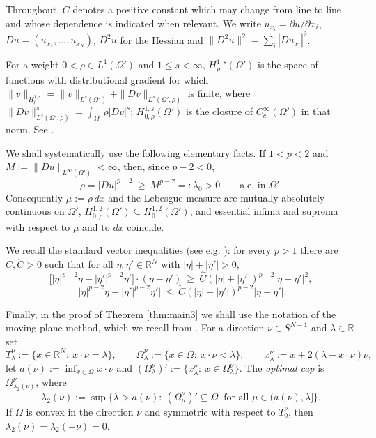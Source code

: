 \documentclass[reqno]{amsart}
\theoremstyle{plain}
\theoremstyle{definition}
\theoremstyle{remark}
\newcommand{\R}{\mathbb{R}}
\begin{document}
Throughout, $C$ denotes a positive constant which may change from line to line and whose dependence
is indicated when relevant. We write $u_{x_i}=\partial u/\partial x_i$, $Du=(u_{x_1},\dots,u_{x_N})$,
$D^2u$ for the Hessian and $\|D^2u\|^2=\sum_{i}|Du_{x_i}|^2$.

For a weight $0<\rho\in L^1(\Omega')$ and $1\le s<\infty$, $H^{1,s}_{\rho}(\Omega')$ is the space of
functions with distributional gradient for which
$\|v\|_{H^{1,s}_\rho}=\|v\|_{L^s(\Omega')}+\|Dv\|_{L^s(\Omega',\rho)}$ is finite, where
$\|Dv\|^s_{L^s(\Omega',\rho)}=\int_{\Omega'}\rho|Dv|^s$; $H^{1,s}_{0,\rho}(\Omega')$ is the closure of
$C_c^\infty(\Omega')$ in that norm. See \cite{DS1,HKM,Tru2}.

We shall systematically use the following elementary facts. If $1<p<2$ and
$M:=\|Du\|_{L^\infty(\Omega')}<\infty$, then, since $p-2<0$,
\begin{equation}\label{eq:lowerweight}
\rho=|Du|^{p-2}\ \ge\ M^{p-2}=:\lambda_0>0\qquad\text{a.e. in }\Omega' .
\end{equation}
Consequently $\mu:=\rho\,dx$ and the Lebesgue measure are mutually absolutely continuous on
$\Omega'$, $H^{1,2}_{0,\rho}(\Omega')\subseteq H^{1,2}_0(\Omega')$, and essential infima and suprema
with respect to $\mu$ and to $dx$ coincide.

We recall the standard vector inequalities (see e.g. \cite[Lemma 2.1]{Dam1}): for every $p>1$ there
are $\hat C,\check C>0$ such that for all $\eta,\eta'\in\R^N$ with $|\eta|+|\eta'|>0$,
\begin{equation}\label{eq:vector}
\big[|\eta|^{p-2}\eta-|\eta'|^{p-2}\eta'\big]\cdot(\eta-\eta')\ \ge\ \hat C(|\eta|+|\eta'|)^{p-2}|\eta-\eta'|^2 ,
\end{equation}
\begin{equation}\label{eq:vector2}
\big||\eta|^{p-2}\eta-|\eta'|^{p-2}\eta'\big|\ \le\ \check C(|\eta|+|\eta'|)^{p-2}|\eta-\eta'| .
\end{equation}

Finally, in the proof of Theorem \ref{thm:main3} we shall use the notation of the moving plane
method, which we recall from \cite[\S2]{DS2}. For a direction $\nu\in S^{N-1}$ and $\lambda\in\R$ set
\[
T^\nu_\lambda:=\{x\in\R^N:\ x\cdot\nu=\lambda\},\qquad
\Omega^\nu_\lambda:=\{x\in\Omega:\ x\cdot\nu<\lambda\},\qquad
x^\nu_\lambda:=x+2(\lambda-x\cdot\nu)\nu ,
\]
let $a(\nu):=\inf_{x\in\Omega}x\cdot\nu$ and
$(\Omega^\nu_\lambda)':=\{x^\nu_\lambda:\ x\in\Omega^\nu_\lambda\}$. The \emph{optimal cap} is
$\Omega^\nu_{\lambda_2(\nu)}$, where
\[
\lambda_2(\nu):=\sup\big\{\lambda>a(\nu):\ (\Omega^\nu_\mu)'\subseteq\Omega\ \text{ for all }\mu\in(a(\nu),\lambda]\big\} .
\]
If $\Omega$ is convex in the direction $\nu$ and symmetric with respect to $T^\nu_0$, then
$\lambda_2(\nu)=\lambda_2(-\nu)=0$.
\end{document}
